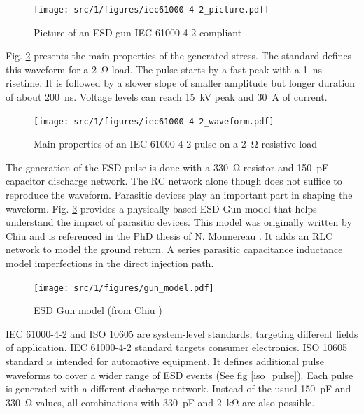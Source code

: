\begin{figure}[!h]
  \centering
  \texttt{[image: src/1/figures/iec61000-4-2\_picture.pdf]}
  \caption{Picture of an ESD gun IEC 61000-4-2 compliant}
  \label{fig:picture-esd-gun}
\end{figure}

Fig. \ref{iec_pulse} presents the main properties of the generated stress.
The standard defines this waveform for a \SI{2}{\ohm} load.
The pulse starts by a fast peak with a \SI{1}{\nano\second} risetime.
It is followed by a slower slope of smaller amplitude but longer duration of about \SI{200}{\nano\second}.
Voltage levels can reach \SI{15}{\kilo\volt} peak and \SI{30}{\ampere} of current.

\begin{figure}[!h]
  \centering
  \texttt{[image: src/1/figures/iec61000-4-2\_waveform.pdf]}
  \caption{Main properties of an IEC 61000-4-2 pulse on a \SI{2}{\ohm} resistive load}
  \label{iec_pulse}
\end{figure}

The generation of the ESD pulse is done with a \SI{330}{\ohm} resistor and \SI{150}{\pico\farad} capacitor discharge network.
The RC network alone though does not suffice to reproduce the waveform.
Parasitic devices play an important part in shaping the waveform.
Fig. \ref{fig:esd-gun-model} provides a physically-based ESD Gun model that helps understand the impact of parasitic devices.
This model was originally written by Chiu \cite{phd-chiu} and is referenced in the PhD thesis of N. Monnereau \cite{phd-monnereau}.
It adds an RLC network to model the ground return.
A series parasitic capacitance inductance model imperfections in the direct injection path.

\begin{figure}[!h]
  \centering
  \texttt{[image: src/1/figures/gun\_model.pdf]}
  \caption{ESD Gun model (from Chiu \cite{phd-chiu})}
  \label{fig:esd-gun-model}
\end{figure}

IEC 61000-4-2 \cite{iec61000-4-2} and ISO 10605 \cite{iso10605} are system-level standards, targeting different fields of application.
IEC 61000-4-2\cite{iec61000-4-2} standard targets consumer electronics.
ISO 10605\cite{iso10605} standard is intended for automotive equipment.
It defines additional pulse waveforms to cover a wider range of ESD events (See fig \ref{iso_pulse}).
Each pulse is generated with a different discharge network.
Instead of the usual \SI{150}{\pico\farad} and \SI{330}{\ohm} values, all combinations with \SI{330}{\pico\farad} and \SI{2}{\kilo\ohm} are also possible.

